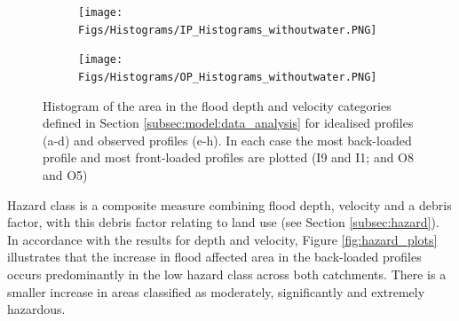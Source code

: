 \documentclass[APA,Times2COL]{WileyNJDv5}
\begin{document}
\begin{figure}[!t] 
\begin{subfigure}[H]{\linewidth}
\texttt{[image: Figs/Histograms/IP\_Histograms\_withoutwater.PNG]}
\end{subfigure}
\begin{subfigure}[H]{\linewidth}
\texttt{[image: Figs/Histograms/OP\_Histograms\_withoutwater.PNG]}
\end{subfigure}
\caption{Histogram of the area in the flood depth and velocity categories defined in Section \ref{subsec:model:data_analysis} for idealised profiles (a-d) and observed profiles (e-h). In each case the most back-loaded profile and most front-loaded profiles are plotted  (I9 and I1; and O8 and O5)} \label{fig:histograms} 
\end{figure}

Hazard class is a composite measure combining flood depth, velocity and a debris factor, with this debris factor relating to land use (see Section \ref{subsec:hazard}). In accordance with the results for depth and velocity, Figure \ref{fig:hazard_plots} illustrates that the increase in flood affected area in the back-loaded profiles occurs predominantly in the low hazard class across both catchments. There is a smaller increase in areas classified as moderately, significantly and extremely hazardous.
\end{document}
